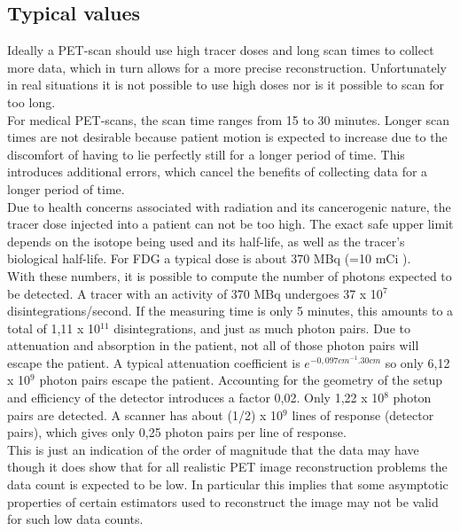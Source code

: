 \documentclass[report,12pt]{report}
\newcommand{\superscript}[1]{\ensuremath{^{\textrm{#1}}}}
\begin{document}
\subsection{Typical values}
\label{sect:typicalvalues}
Ideally a PET-scan should use high tracer doses and long scan times to collect more data, which in turn allows for a more precise reconstruction. Unfortunately in real situations it is not possible to use high doses nor is it possible to scan for too long.\\

For medical PET-scans, the scan time ranges from 15 to 30 minutes. Longer scan times are not desirable because patient motion is expected to increase due to the discomfort of having to lie perfectly still for a longer period of time. This introduces additional errors, which cancel the benefits of collecting data for a longer period of time.\\ 

Due to health concerns associated with radiation and its cancerogenic nature, the tracer dose injected into a patient can not be too high. The exact safe upper limit depends on the isotope being used and its half-life, as well as the tracer's biological half-life. For FDG a typical dose is about 370 MBq (=10 mCi ).\\

With these numbers, it is possible to compute the number of photons expected to be detected. A tracer with an activity of 370 MBq undergoes 37 x 10\superscript{7} disintegrations/second. If the measuring time is only 5 minutes, this amounts to a total of 1,11 x 10\superscript{11} disintegrations, and just as much photon pairs. Due to attenuation and absorption in the patient, not all of those photon pairs will escape the patient. A typical attenuation coefficient is $e^{-0,097 cm^{-1} . 30 cm}$ so only 6,12 x 10\superscript{9} photon pairs escape the patient. Accounting for the geometry of the setup and efficiency of the detector introduces a factor 0,02. Only 1,22 x 10\superscript{8} photon pairs are detected. A  scanner has about (1/2) x 10\superscript{9} lines of response (detector pairs), which gives only 0,25 photon pairs per line of response.\\

This is just an indication of the order of magnitude that the data may have though it does show that for all realistic PET image reconstruction problems the data count is expected to be low. In particular this implies that some asymptotic properties of certain estimators used to reconstruct the image may not be valid for such low data counts. 
\end{document}

